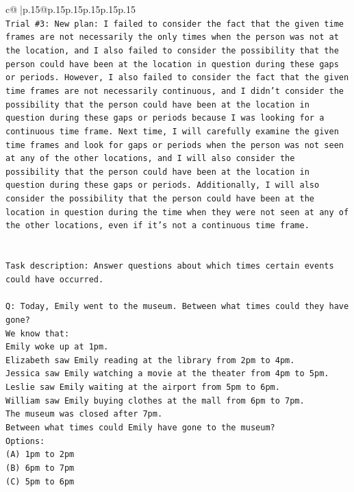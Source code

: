 \documentclass{article}
\begin{document}
{\begin{supertabular}{c@{$\;$}|p{.15\linewidth}@{}p{.15\linewidth}p{.15\linewidth}p{.15\linewidth}p{.15\linewidth}p{.15\linewidth}}
{{{\\ 
\texttt{Trial \#3: New plan: I failed to consider the fact that the given time frames are not necessarily the only times when the person was not at the location, and I also failed to consider the possibility that the person could have been at the location in question during these gaps or periods. However, I also failed to consider the fact that the given time frames are not necessarily continuous, and I didn't consider the possibility that the person could have been at the location in question during these gaps or periods because I was looking for a continuous time frame. Next time, I will carefully examine the given time frames and look for gaps or periods when the person was not seen at any of the other locations, and I will also consider the possibility that the person could have been at the location in question during these gaps or periods. Additionally, I will also consider the possibility that the person could have been at the location in question during the time when they were not seen at any of the other locations, even if it's not a continuous time frame.} \\
\\ 
\\ 
\texttt{Task description: Answer questions about which times certain events could have occurred.} \\
\\ 
\texttt{Q: Today, Emily went to the museum. Between what times could they have gone?} \\
\texttt{We know that:} \\
\texttt{Emily woke up at 1pm.} \\
\texttt{Elizabeth saw Emily reading at the library from 2pm to 4pm.} \\
\texttt{Jessica saw Emily watching a movie at the theater from 4pm to 5pm.} \\
\texttt{Leslie saw Emily waiting at the airport from 5pm to 6pm.} \\
\texttt{William saw Emily buying clothes at the mall from 6pm to 7pm.} \\
\texttt{The museum was closed after 7pm.} \\
\texttt{Between what times could Emily have gone to the museum?} \\
\texttt{Options:} \\
\texttt{(A) 1pm to 2pm} \\
\texttt{(B) 6pm to 7pm} \\
\texttt{(C) 5pm to 6pm} \\
}}}
\end{supertabular}}
\end{document}

